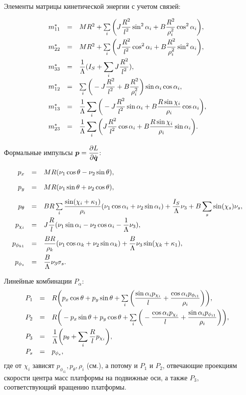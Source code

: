 Элементы матрицы кинетической энергии с учетом связей:

\begin{equation}\label{mstar}
    \begin{array}{rcl}
        m^*_{11} & = & MR^2 + \sum\limits_i \bigg( J\ddfrac{R^2}{l^2}\sin^2\alpha_i + B\ddfrac{R^2}{\rho_i^2}\cos^2\alpha_i\bigg),\vsp
        m^*_{22} & = & MR^2 + \sum\limits_i \bigg(J\ddfrac{R^2}{l^2}\cos^2\alpha_i + B\ddfrac{R^2}{\rho_i^2}\sin^2\alpha_i\bigg),\vsp
        m^*_{33} & = & \ddfrac{1}{\Lambda}(I_S + \sum\limits_i J\ddfrac{R^2}{l^2}),\vsp
        m^*_{12} & = & \sum\limits_i \bigg(-J\ddfrac{R^2}{l^2} + B\ddfrac{R^2}{\rho_i^2}\bigg)\sin\alpha_i\cos\alpha_i,\vsp
        m^*_{13} & = & \ddfrac{1}{\Lambda}\sum\limits_i \bigg(-J\ddfrac{R^2}{l^2}\sin\alpha_i +  B\ddfrac{R\sin\chi_i}{\rho_i}\cos\alpha_i\bigg),\vsp
        m^*_{23} & = & \ddfrac{1}{\Lambda}\sum\limits_i \bigg(J\ddfrac{R^2}{l^2}\cos\alpha_i +  B\ddfrac{R\sin\chi_i}{\rho_i}\sin\alpha_i\bigg).\vsp
    \end{array}
\end{equation}

Формальные импульсы $\vec{p} = \ddpd{L}{\dot{\vec{q}}}$:

\begin{equation}\label{p}
    \begin{array}{rcl}
        p_x & = & MR(\nu_1\cos\theta-\nu_2\sin\theta),\vsp
        p_y & = & MR(\nu_1\sin\theta+\nu_2\cos\theta),\vsp
        p_\theta & = & BR\sum\limits_i\ddfrac{\sin(\chi_i + \kappa_1)}{\rho_i}(\nu_1\cos\alpha_i + \nu_2\sin\alpha_i) + \ddfrac{I_S}{\Lambda}\nu_3 + B\sum\limits_s\sin(\chi_s)\nu_s,\vsp
        p_{\chi_i} & = & J\ddfrac{R}{l}(\nu_1\sin\alpha_i - \nu_2\cos\alpha_i - \ddfrac{1}{\Lambda}\nu_3),\vsp
        p_{\phi_{k1}} & = & \ddfrac{BR}{\rho_k}(\nu_1\cos\alpha_k + \nu_2\sin\alpha_k) + \ddfrac{B}{\Lambda}\nu_3\sin(\chi_k+\kappa_1),\vsp
        p_{\phi_s} & = & \ddfrac{B}{\Lambda}\nu_3\sigma_s.
    \end{array}
\end{equation}

Линейные комбинации $P_\alpha$:
\begin{equation}\label{P}
    \begin{array}{rcl}
        P_1 & = & R\bigg(p_x\cos\theta + p_y\sin\theta + \sum\limits_{i}\bigg(\ddfrac{\sin\alpha_ip_{\chi_i}}{l} +  \ddfrac{\cos\alpha_ip_{\phi_{i1}}}{\rho_i}\bigg)\bigg),\vsp
        P_2 & = & R\bigg(-p_x\sin\theta + p_y\cos\theta + \sum\limits_{i}\bigg(-\ddfrac{\cos\alpha_ip_{\chi_i}}{l} +  \ddfrac{\sin\alpha_ip_{\phi_{i1}}}{\rho_i}\bigg)\bigg),\vsp
        P_3 & = & \ddfrac{1}{\Lambda}\bigg(p_\theta + \sum\limits_{i}\ddfrac{R}{l}p_{\chi_i}\bigg),\vsp
        P_s & = & p_{\phi_s},
    \end{array}
\end{equation}
где от $\chi_i$ зависят $p_{\phi_{i1}}, p_\theta, \rho_i$ (см.), а потому и $P_1$ и $P_2$, отвечающие проекциям скорости центра масс платформы на подвижные оси, а также $P_3$, соответствующий вращению платформы.

